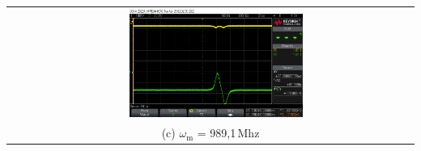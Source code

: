 \begin{center}
\begin{tabular}{c c}
        & \includegraphics[width=0.45\textwidth]{Bilder/Jodlinie/scope_9.png} \\
        \multicolumn{2}{c}{(c) $\omega_\mathrm{m} $ = 989,1\,Mhz} 
    \end{tabular}
    \label{fig:absorp}
\end{center}


%
%
